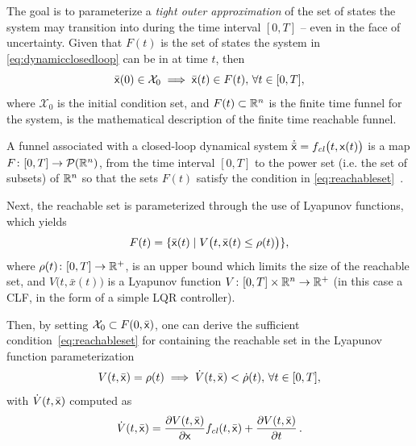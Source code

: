 The goal is to parameterize a \textit{tight outer approximation} of the set of
states the system may transition into during the time interval \([0,T]\) -- even
in the face of uncertainty. Given that \(F(t)\) is the set of states the
system in \cref{eq:dynamicclosedloop} can be in at time \(t\), then
\begin{equation}
  \label{eq:reachableset}
  \bar{{\mathbf{\mathsf{x}}}}(0) \in \mathcal{X}_0 \implies \bar{{\mathbf{\mathsf{x}}}}(t) \in F(t), \, \forall t \in [0,T],
\end{equation}
where \(\mathcal{X}_0\) is the initial condition set, and \(F(t) \subset \mathbb{R}^n\)
is the finite time funnel for the system, is the mathematical description of the
finite time reachable funnel.

\begin{definition}
  \label{def:funnel}
  A funnel associated with a closed-loop dynamical system \(\dot{\bar{{\mathbf{\mathsf{x}}}}}
  = f_{\mathit{cl}}\big( t,{\mathbf{\mathsf{x}}}(t) \big) \) is a map \(F \colon [0,T]
  \rightarrow \mathcal{P}(\mathbb{R}^n)\), from the time interval \([0,T]\) to the power
  set (i.e. the set of subsets) of \(\mathbb{R}^n\) so that the sets \(F(t)\) satisfy
  the
  condition in \cref{eq:reachableset}~\cite{majumdarFunnelLibrariesRealtime2017}.
\end{definition}

Next, the reachable set is parameterized through the use of Lyapunov functions,
which yields
\begin{equation}
  F(t) = \lbrace\bar{{\mathbf{\mathsf{x}}}}(t) \mid V \big(t, \bar{{\mathbf{\mathsf{x}}}}(t) \leq \rho (t) \big)\rbrace,
\end{equation}
where \(\rho (t) \colon [0,T] \rightarrow \mathbb{R}^+\), is an upper bound which limits
the size of the reachable set, and \(V \big(t,\bar{x}(t) \big)\) is a Lyapunov
function \(V \colon [0,T] \times \mathbb{R}^n \rightarrow \mathbb{R}^+\) (in this case a
\ac{CLF}, in the form of a simple \ac{LQR} controller).

Then, by setting \(\mathcal{X}_0 \subset F(0,\bar{{\mathbf{\mathsf{x}}}})\), one can derive
the sufficient condition~\cref{eq:reachableset} for containing the reachable set
in the Lyapunov function parameterization
\begin{equation}
  \label{eq:funnelsufficient}
  V(t,\bar{{\mathbf{\mathsf{x}}}}) = \rho(t) \implies \dot{V}(t,\bar{{\mathbf{\mathsf{x}}}}) < \dot{\rho}(t), \, \forall t \in [0,T], 
\end{equation}
with \(\dot{V}(t,\bar{{\mathbf{\mathsf{x}}}})\) computed as
\begin{equation}
  \dot{V}(t,\bar{{\mathbf{\mathsf{x}}}}) = \frac{\partial V(t,\bar{{\mathbf{\mathsf{x}}}})}{\partial {\mathbf{\mathsf{x}}}} f_{\mathit{cl}}(t,\bar{{\mathbf{\mathsf{x}}}}) + \frac{\partial V(t,\bar{{\mathbf{\mathsf{x}}}})}{\partial t} \, .
\end{equation}

